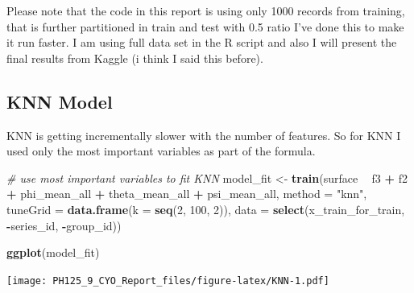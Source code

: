 \documentclass[]{article}
\newenvironment{Shaded}{\begin{snugshade}}{\end{snugshade}}
\newcommand{\CommentTok}[1]{\textcolor[rgb]{0.56,0.35,0.01}{\textit{#1}}}
\newcommand{\DataTypeTok}[1]{\textcolor[rgb]{0.13,0.29,0.53}{#1}}
\newcommand{\DecValTok}[1]{\textcolor[rgb]{0.00,0.00,0.81}{#1}}
\newcommand{\KeywordTok}[1]{\textcolor[rgb]{0.13,0.29,0.53}{\textbf{#1}}}
\newcommand{\NormalTok}[1]{#1}
\newcommand{\OperatorTok}[1]{\textcolor[rgb]{0.81,0.36,0.00}{\textbf{#1}}}
\newcommand{\StringTok}[1]{\textcolor[rgb]{0.31,0.60,0.02}{#1}}
\begin{document}
Please note that the code in this report is using only 1000 records from
training, that is further partitioned in train and test with 0.5 ratio
I've done this to make it run faster. I am using full data set in the R
script and also I will present the final results from Kaggle (i think I
said this before).

\hypertarget{knn-model}{%
\subsection{KNN Model}\label{knn-model}}

KNN is getting incrementally slower with the number of features. So for
KNN I used only the most important variables as part of the formula.

\begin{Shaded}
\begin{Highlighting}[]
\CommentTok{# use most important variables to fit KNN}
\NormalTok{model_fit <-}\StringTok{ }\KeywordTok{train}\NormalTok{(surface }\OperatorTok{~}\StringTok{ }\NormalTok{f3 }\OperatorTok{+}\StringTok{ }\NormalTok{f2 }\OperatorTok{+}\StringTok{ }\NormalTok{phi_mean_all }\OperatorTok{+}\StringTok{ }\NormalTok{theta_mean_all }\OperatorTok{+}\StringTok{ }\NormalTok{psi_mean_all,  }\DataTypeTok{method =} \StringTok{"knn"}\NormalTok{, }
             \DataTypeTok{tuneGrid =} \KeywordTok{data.frame}\NormalTok{(}\DataTypeTok{k =} \KeywordTok{seq}\NormalTok{(}\DecValTok{2}\NormalTok{, }\DecValTok{100}\NormalTok{, }\DecValTok{2}\NormalTok{)), }
             \DataTypeTok{data =} \KeywordTok{select}\NormalTok{(x_train_for_train, }\OperatorTok{-}\NormalTok{series_id, }\OperatorTok{-}\NormalTok{group_id))}

\KeywordTok{ggplot}\NormalTok{(model_fit) }
\end{Highlighting}
\end{Shaded}

\texttt{[image: PH125\_9\_CYO\_Report\_files/figure-latex/KNN-1.pdf]}

\begin{Shaded}
\end{Shaded}
\end{document}
